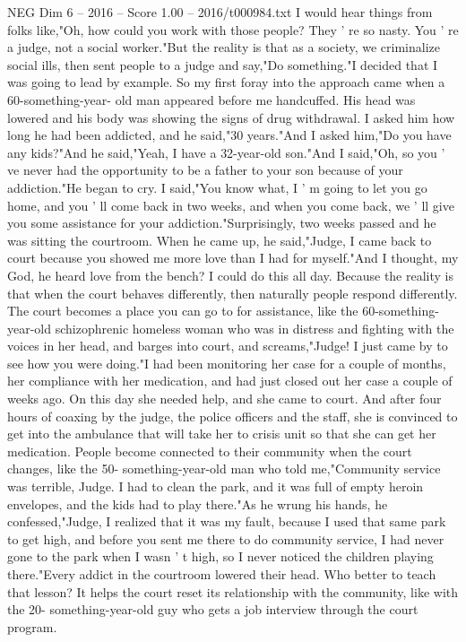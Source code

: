 \begin{textsample}{NEG Dim 6 – 2016 – Score 1.00 – 2016/t000984.txt}
I would hear things from folks like,"Oh, how could you work with those people?
They ' re so nasty.
You ' re a judge, not a social worker."But the reality is that as a society, we criminalize social ills, then sent people to a judge and say,"Do something."I decided that I was going to lead by example.
So my first foray into the approach came when a 60-something-year- old man appeared before me handcuffed.
His head was lowered and his body was showing the signs of drug withdrawal.
I asked him how long he had been addicted, and he said,"30 years."And I asked him,"Do you have any kids?"And he said,"Yeah, I have a 32-year-old son."And I said,"Oh, so you ' ve never had the opportunity to be a father to your son because of your addiction."He began to cry.
I said,"You know what, I ' m going to let you go home, and you ' ll come back in two weeks, and when you come back, we ' ll give you some assistance for your addiction."Surprisingly, two weeks passed and he was sitting the courtroom.
When he came up, he said,"Judge, I came back to court because you showed me more love than I had for myself."And I thought, my God, he heard love from the bench?
I could do this all day.
Because the reality is that when the court behaves differently, then naturally people respond differently.
The court becomes a place you can go to for assistance, like the 60-something-year-old schizophrenic homeless woman who was in distress and fighting with the voices in her head, and barges into court, and screams,"Judge!
I just came by to see how you were doing."I had been monitoring her case for a couple of months, her compliance with her medication, and had just closed out her case a couple of weeks ago.
On this day she needed help, and she came to court.
And after four hours of coaxing by the judge, the police officers and the staff, she is convinced to get into the ambulance that will take her to crisis unit so that she can get her medication.
People become connected to their community when the court changes, like the 50- something-year-old man who told me,"Community service was terrible, Judge.
I had to clean the park, and it was full of empty heroin envelopes, and the kids had to play there."As he wrung his hands, he confessed,"Judge, I realized that it was my fault, because I used that same park to get high, and before you sent me there to do community service, I had never gone to the park when I wasn ' t high, so I never noticed the children playing there."Every addict in the courtroom lowered their head.
Who better to teach that lesson?
It helps the court reset its relationship with the community, like with the 20- something-year-old guy who gets a job interview through the court program.

\end{textsample}
